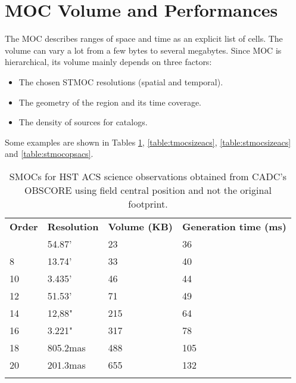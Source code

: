 \section{MOC Volume and Performances}
\label{app:perf}
The MOC describes ranges of space and time as an explicit list of cells. The
volume can vary a lot from a few bytes to several megabytes.
Since MOC is hierarchical, its volume mainly depends on three factors:
\begin{itemize}
\item The chosen STMOC resolutions (spatial and temporal).
\item The geometry of the region and its time coverage.
\item The density of sources for catalogs.   
\end{itemize}

Some examples are shown in Tables \ref{table:smocsizeacs}, \ref{table:tmocsizeacs}, \ref{table:stmocsizeacs} and \ref{table:stmocopsacs}.

\begin{table}[!htbp]
\begin{center}
{\scriptsize
\begin{tabular}{p{}p{}p{}p{}}
\sptablerule
\textbf{Order} & \textbf{Resolution} & \textbf{Volume (KB)} & \textbf{Generation \newline time (ms)}\\
\sptablerule
6	&	54.87'	&	23	&	36 \\
8	&	13.74'	&	33	&	40 \\
10	&	3.435'	&	46	&	44 \\
12	&	51.53'	&	71	&	49 \\
14	&	12,88"	&	215	&	64 \\
16	&	3.221"	&	317	&	78 \\
18	&	805.2mas	&	488	&	105 \\
20	&	201.3mas	&	655	&	132 \\
\sptablerule
\end{tabular}
\caption[SMOC performances]{SMOCs for HST ACS science observations
  obtained from CADC's OBSCORE using field central position and
  not the original footprint.}
\normalsize
\label{table:smocsizeacs}
}
\end{center}
\end{table}



